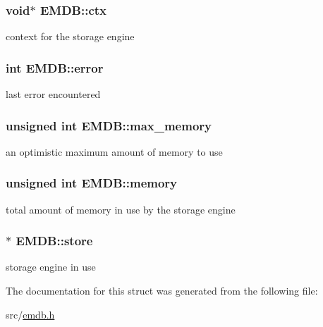 \subsubsection[{ctx}]{\setlength{\rightskip}{0pt plus 5cm}void$\ast$ E\+M\+D\+B\+::ctx}\label{struct_e_m_d_b_a726fbe533f115c88e1afb228a9a19116}
context for the storage engine \hypertarget{struct_e_m_d_b_a32e49b3af8a306edeb638245a6afffc0}{}
\subsubsection[{error}]{\setlength{\rightskip}{0pt plus 5cm}int E\+M\+D\+B\+::error}\label{struct_e_m_d_b_a32e49b3af8a306edeb638245a6afffc0}
last error encountered \hypertarget{struct_e_m_d_b_ade62d88e06b82b474ce9a05a819c5924}{}
\subsubsection[{max\+\_\+memory}]{\setlength{\rightskip}{0pt plus 5cm}unsigned int E\+M\+D\+B\+::max\+\_\+memory}\label{struct_e_m_d_b_ade62d88e06b82b474ce9a05a819c5924}
an optimistic maximum amount of memory to use \hypertarget{struct_e_m_d_b_a660445dd107e08aebc47cf7690565d14}{}
\subsubsection[{memory}]{\setlength{\rightskip}{0pt plus 5cm}unsigned int E\+M\+D\+B\+::memory}\label{struct_e_m_d_b_a660445dd107e08aebc47cf7690565d14}
total amount of memory in use by the storage engine \hypertarget{struct_e_m_d_b_a872289fb194a97cf2718c680a7cee154}{}
\subsubsection[{store}]{$\ast$ E\+M\+D\+B\+::store}\label{struct_e_m_d_b_a872289fb194a97cf2718c680a7cee154}
storage engine in use 

The documentation for this struct was generated from the following file\+:\begin{DoxyCompactItemize}
\item 
src/\hyperlink{emdb_8h}{emdb.\+h}\end{DoxyCompactItemize}
